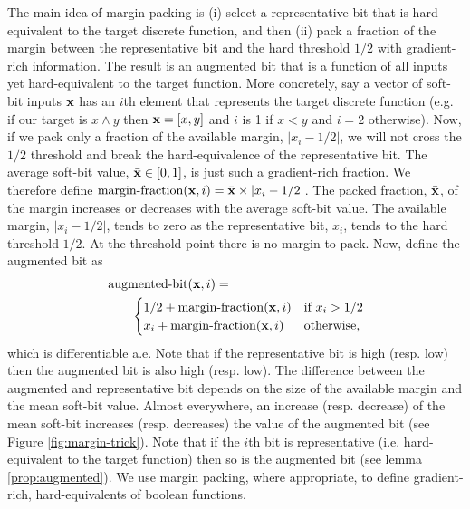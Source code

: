 \documentclass{article}
\theoremstyle{plain}
\theoremstyle{definition}
\theoremstyle{remark}
\begin{document}
The main idea of margin packing is (i) select a representative bit that is hard-equivalent to the target discrete function, and then (ii) pack a fraction of the margin between the representative bit and the hard threshold $1/2$ with gradient-rich information. The result is an augmented bit that is a function of all inputs yet hard-equivalent to the target function. More concretely, say a vector of soft-bit inputs ${\bf x}$ has an $i$th element that represents the target discrete function (e.g. if our target is $x \wedge y$ then ${\bf x}=[x,y]$ and $i$ is 1 if $x<y$ and $i=2$ otherwise). Now, if we pack only a fraction of the available margin, $|x_{i}-1/2|$, we will not cross the $1/2$ threshold and break the hard-equivalence of the representative bit. The average soft-bit value, $\bar{\bf x} \in [0,1]$, is just such a gradient-rich fraction. We therefore define $\operatorname{margin-fraction}({\bf x}, i) = \bar{\bf x} \times \left|x_{i} - 1/2\right|$. The packed fraction, $\bar{\bf x}$, of the margin increases or decreases with the average soft-bit value. The available margin, $\left|x_{i} - 1/2\right|$, tends to zero as the representative bit, $x_{i}$, tends to the hard threshold $1/2$. At the threshold point there is no margin to pack. Now, define the augmented bit as
\begin{equation}
\begin{aligned}
&\operatorname{augmented-bit}({\bf x}, i) =\\
& ~~~~~~ 
\begin{cases}
1/2 + \operatorname{margin-fraction}({\bf x}, i) & \text{if } x_{i} > 1/2 \\
x_{i} + \operatorname{margin-fraction}({\bf x}, i) & \text{otherwise,}
\end{cases}
\end{aligned}
\label{eq:augmented-bit}
\end{equation}
which is differentiable a.e. Note that if the representative bit is high (resp. low) then the augmented bit is also high (resp. low). The difference between the augmented and representative bit depends on the size of the available margin and the mean soft-bit value. Almost everywhere, an increase (resp. decrease) of the mean soft-bit increases (resp. decreases) the value of the augmented bit (see Figure \ref{fig:margin-trick}). Note that if the $i$th bit is representative (i.e. hard-equivalent to the target function) then so is the augmented bit (see lemma \ref{prop:augmented}). We use margin packing, where appropriate, to define gradient-rich, hard-equivalents of boolean functions.
\end{document}
